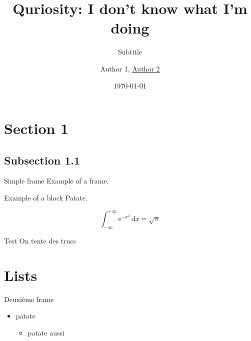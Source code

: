 \documentclass{beamer}
\title{Quriosity: I don't know what I'm doing}
\subtitle{Subtitle}
\author{Author 1, \underline{Author 2}}
\institute{Télécom Paris, QURIOSITY Team}
\date{\today}
\begin{document}
    \begin{frame}
        \maketitle
    \end{frame}
    \section{Section 1}
    \subsection{Subsection 1.1}
    \begin{frame}{Simple frame}
        Example of a frame.
	    \begin{block}{Example of a block}
		    Patate.
	    \end{block}
        \begin{equation}
            \int_{-\infty}^{+\infty}\mathrm{e}^{-x^2}\,\mathrm{d}x=\sqrt{\pi}
        \end{equation}
        \begin{alertblock}{Test}
            On tente des trucs
        \end{alertblock}
    \end{frame}
    \section{Lists}
    \begin{frame}{Deuxième frame}
        \begin{itemize}
            \item patate
                \begin{itemize}
                    \item patate aussi
                \end{itemize}
        \end{itemize}
    \end{frame}
\end{document}
